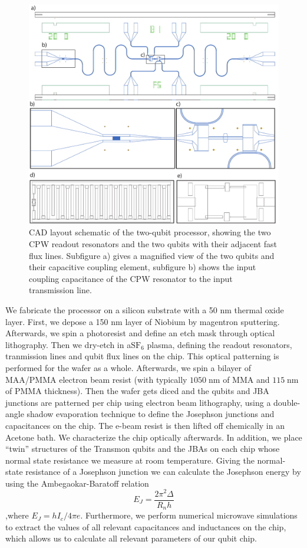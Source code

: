 \begin{figure}[ht!]
	\centering
	\includegraphics[width=\textwidth]{./material/figures/2-qubit-processor/fabrication/qubit_processor_layout}
	\caption[]{CAD layout schematic of the two-qubit processor, showing the two CPW readout resonators and the two qubits with their adjacent fast flux lines. Subfigure a) gives a magnified view of the two qubits and their capacitive coupling element, subfigure b) shows the input coupling capacitance of the CPW resonator to the input transmission line.}
	\label{fig:processor_fabrication}
\end{figure}

We fabricate the processor on a silicon substrate with a 50 nm thermal oxide layer. First, we depose a 150 nm layer of Niobium by magentron sputtering. Afterwards, we spin a photoresist and define an etch mask through optical lithography. Then we dry-etch in a$\mathrm{SF}_6$ plasma, defining the readout resonators, tranmission lines and qubit flux lines on the chip. This optical patterning is performed for the wafer as a whole. Afterwards, we spin a bilayer of MAA/PMMA electron beam resist (with typically $1050\;\mathrm{nm}$ of MMA and $115\;\mathrm{nm}$ of PMMA thickness). Then the wafer gets diced and the qubits and JBA junctions are patterned per chip using electron beam lithography, using a double-angle shadow evaporation technique to define the Josephson junctions and capacitances on the chip. The e-beam resist is then lifted off chemically in an Acetone bath. We characterize the chip optically afterwards. In addition, we place ``twin'' structures of the Transmon qubits and the JBAs on each chip whose normal state resistance we measure at room temperature. Giving the normal-state resistance of a Josephson junction we can calculate the Josephson energy by using the Ambegaokar-Baratoff relation
%
\begin{equation}
E_J = \frac{2\pi^2 \Delta}{R_n h}
\end{equation}
%
,where $E_J = h I_c / 4\pi e$. Furthermore, we perform numerical microwave simulations to extract the values of all relevant capacitances and inductances on the chip, which allows us to calculate all relevant parameters of our qubit chip.

